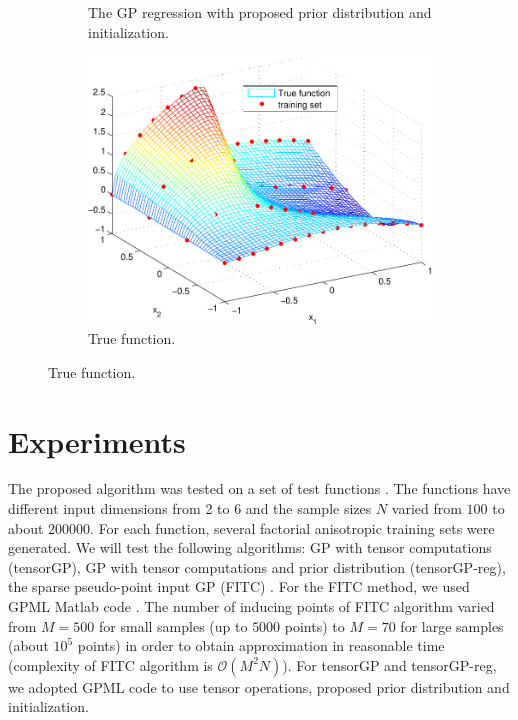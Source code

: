 \begin{figure}
\begin{subfigure}[b]{0.45\textwidth}
      \caption{The GP regression with proposed prior distribution and initialization.}
      \label{fig:nondegenerate_tensorGP}
  \end{subfigure}
  \begin{subfigure}[b]{0.45\textwidth}
      \includegraphics[width=\textwidth]{figures/gp_on_grid/degeneration_true.pdf}
      \caption{True function.}
      \label{fig:anisotropy_degeneracy_true}
  \end{subfigure}
\end{figure}


\section{Experiments}
The proposed algorithm was tested on a set of test functions \citep{lappeenranta, ETH}.
The functions have different input dimensions from 2 to 6 and the sample sizes $N$
varied from $100$ to about $200000$.
For each function, several factorial anisotropic training sets were generated.
We will test the following algorithms: GP with tensor computations (tensorGP),
GP with tensor computations and prior distribution (tensorGP-reg),
the sparse pseudo-point input GP (FITC) \citep{snelson06sparsegaussian}.
For the FITC method, we used GPML Matlab code \citep{gpmltoolbox}.
The number of inducing points of FITC algorithm varied from $M = 500$ for small samples (up to $5000$ points)
to $M = 70$ for large samples (about $10^5$ points) in order to obtain approximation in reasonable time
(complexity of FITC algorithm is $\mathcal{O}(M^2N)$).
For tensorGP and tensorGP-reg, we adopted GPML code to use tensor operations, proposed prior distribution
and initialization.

